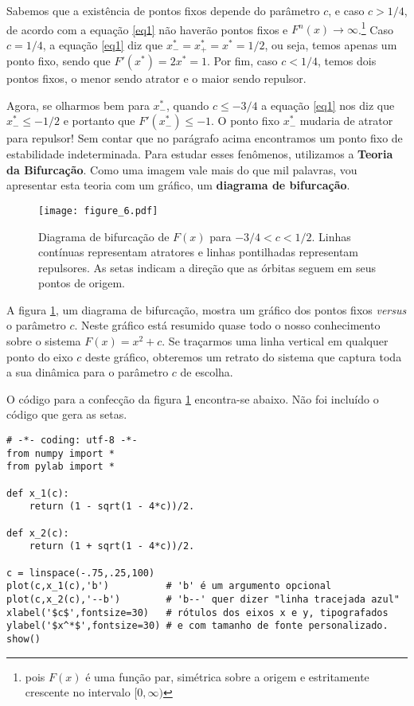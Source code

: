 \documentclass{article}
\begin{document}
Sabemos que a existência de pontos fixos depende do parâmetro $c$, e caso $c>1/4$, de acordo com a equação \ref{eq1} não haverão pontos fixos e $F^n(x) \rightarrow \infty$.\footnote{pois $F(x)$ é uma função par, simétrica sobre a origem e estritamente crescente no intervalo $[0,\infty)$} Caso $c = 1/4$, a equação \ref{eq1} diz que $x^*_- = x^*_+ = x^* = 1/2$, ou seja, temos apenas um ponto fixo, sendo que $F'(x^*) = 2x^* = 1$. Por fim, caso $c < 1/4$, temos dois pontos fixos, o menor sendo atrator e o maior sendo repulsor. 

Agora, se olharmos bem para $x^*_-$, quando $c \leq -3/4$ a equação \ref{eq1} nos diz que $x^*_- \leq -1/2$ e portanto que $F'(x^*_-) \leq -1$. O ponto fixo $x^*_-$ mudaria de atrator para repulsor! Sem contar que no parágrafo acima encontramos um ponto fixo de estabilidade indeterminada. Para estudar esses fenômenos, utilizamos a \textbf{Teoria da Bifurcação}. Como uma imagem vale mais do que mil palavras, vou apresentar esta teoria com um gráfico, um \textbf{diagrama de bifurcação}.

\begin{figure}[hbtp]
\centering
\texttt{[image: figure\_6.pdf]}
\caption{Diagrama de bifurcação de $F(x)$ para $-3/4 < c < 1/2$. Linhas contínuas representam atratores e linhas pontilhadas representam repulsores. As setas indicam a direção que as órbitas seguem em seus pontos de origem.}
\label{fig5}
\end{figure}

A figura \ref{fig5}, um diagrama de bifurcação, mostra um gráfico dos pontos fixos \emph{versus} o parâmetro $c$. Neste gráfico está resumido quase todo o nosso conhecimento sobre o sistema $F(x) = x^2+c$. Se traçarmos uma linha vertical em qualquer ponto do eixo $c$ deste gráfico, obteremos um retrato do sistema que captura toda a sua dinâmica para o parâmetro $c$ de escolha. 

O código para a confecção da figura \ref{fig5} encontra-se abaixo. Não foi incluído o código que gera as setas.
\begin{verbatim}
# -*- coding: utf-8 -*-
from numpy import *
from pylab import *

def x_1(c): 
    return (1 - sqrt(1 - 4*c))/2.

def x_2(c):
    return (1 + sqrt(1 - 4*c))/2.

c = linspace(-.75,.25,100)
plot(c,x_1(c),'b')          # 'b' é um argumento opcional 
plot(c,x_2(c),'--b')        # 'b--' quer dizer "linha tracejada azul"
xlabel('$c$',fontsize=30)   # rótulos dos eixos x e y, tipografados
ylabel('$x^*$',fontsize=30) # e com tamanho de fonte personalizado.
show()
\end{verbatim}
\end{document}
